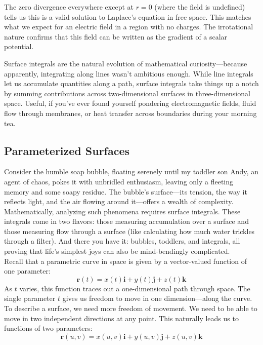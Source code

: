 \begin{example}
\begin{solution}
\noindent The zero divergence everywhere except at $r=0$ (where the field is undefined) tells us this is a valid solution to Laplace's equation in free space. This matches what we expect for an electric field in a region with no charges. The irrotational nature confirms that this field can be written as the gradient of a scalar potential.

\end{solution}
\end{example}
\exampleline



\newpage

  

\noindent Surface integrals are the natural evolution of mathematical curiosity—because apparently, integrating along lines wasn’t ambitious enough. While line integrals let us accumulate quantities along a path, surface integrals take things up a notch by summing contributions across two-dimensional surfaces in three-dimensional space. Useful, if you’ve ever found yourself pondering electromagnetic fields, fluid flow through membranes, or heat transfer across boundaries during your morning tea. 

\subsection*{Parameterized Surfaces} 

\noindent Consider the humble soap bubble, floating serenely until my toddler son Andy, an agent of chaos, pokes it with unbridled enthusiasm, leaving only a fleeting memory and some soapy residue. The bubble’s surface—its tension, the way it reflects light, and the air flowing around it—offers a wealth of complexity. Mathematically, analyzing such phenomena requires surface integrals. These integrals come in two flavors: those measuring accumulation over a surface and those measuring flow through a surface (like calculating how much water trickles through a filter). And there you have it: bubbles, toddlers, and integrals, all proving that life’s simplest joys can also be mind-bendingly complicated. \\

\noindent Recall that a parametric curve in space is given by a vector-valued function of one parameter:
\[
\mathbf{r}(t) = x(t)\mathbf{i} + y(t)\mathbf{j} + z(t)\mathbf{k}
\]
As $t$ varies, this function traces out a one-dimensional path through space. The single parameter $t$ gives us freedom to move in one dimension—along the curve. To describe a surface, we need more freedom of movement. We need to be able to move in two independent directions at any point. This naturally leads us to functions of two parameters:
\[
\mathbf{r}(u,v) = x(u,v)\mathbf{i} + y(u,v)\mathbf{j} + z(u,v)\mathbf{k}
\]

